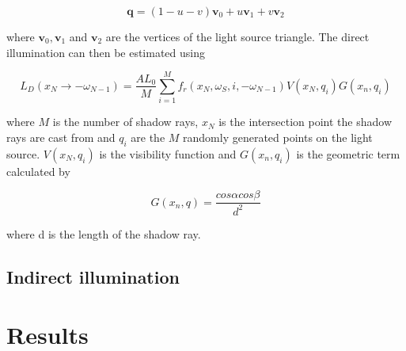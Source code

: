 \documentclass[twocolumn]{article}
\begin{document}
\begin{equation*}
	\mathbf{q} = (1 - u - v)\mathbf{v}_0 + u\mathbf{v}_1 + v\mathbf{v}_2
\end{equation*}

where $\mathbf{v}_0, \mathbf{v}_1$ and $\mathbf{v}_2$ are the vertices of the light source triangle. The direct illumination can then be estimated using

{\small
\begin{equation*}
	L_D(x_N \rightarrow -\omega_{N-1}) = \frac{AL_0}{M} \sum_{i=1}^{M}f_r(x_N, \omega_S, i, -\omega_{N-1})V(x_N, q_i)G(x_n, q_i)
\end{equation*}}

where $M$ is the number of shadow rays, $x_N$ is the intersection point the shadow rays are cast from and $q_i$ are the $M$ randomly generated points on the light source. $V(x_N, q_i)$ is the visibility function and $G(x_n, q_i)$ is the geometric term calculated by 


\begin{equation*}
	G(x_n, q) = \frac{cos\alpha cos\beta}{d^2}
\end{equation*}

where d is the length of the shadow ray.

\subsection{Indirect illumination}

\section{Results}


\newpage
\printbibliography
\end{document}
